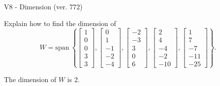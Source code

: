 \begin{exercise}
  \begin{exerciseTitle}V8 - Dimension (ver. 772)\end{exerciseTitle}
  \begin{exerciseStatement}
    Explain how to find the dimension of 
\[W=\mathrm{span}\ \left\{\left[\begin{array}{r}
1 \\
0 \\
0 \\
3 \\
3
\end{array}\right] , \left[\begin{array}{r}
0 \\
1 \\
-1 \\
-2 \\
-4
\end{array}\right] , \left[\begin{array}{r}
-2 \\
-3 \\
3 \\
0 \\
6
\end{array}\right] , \left[\begin{array}{r}
2 \\
4 \\
-4 \\
-2 \\
-10
\end{array}\right] , \left[\begin{array}{r}
1 \\
7 \\
-7 \\
-11 \\
-25
\end{array}\right]\right\}.\]



  \end{exerciseStatement}
  \begin{exerciseAnswer}
   The dimension of \(W\) is  \(2\).
  


  \end{exerciseAnswer}
\end{exercise}